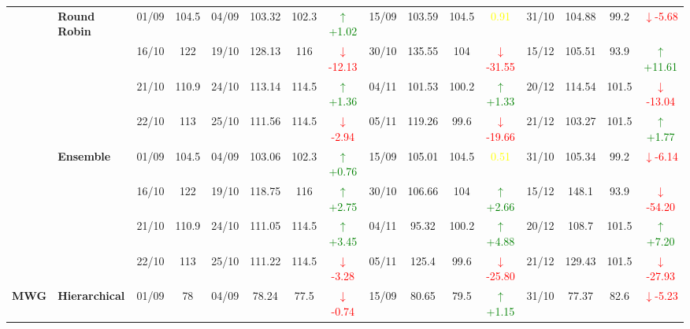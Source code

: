 \documentclass{ieeeaccess}
\begin{document}
{\begin{longtable}{llcc|cccc|cccc|cccc}
& \textbf{Round Robin}
& 01/09 & 104.5 & 04/09 & 103.32 & 102.3 & \textcolor{green}{\(\uparrow\)+1.02} & 15/09 & 103.59 & 104.5 & \textcolor{yellow}{0.91} & 31/10 & 104.88 & 99.2 & \textcolor{red}{\(\downarrow\)-5.68} \\

&
& 16/10 & 122 & 19/10 & 128.13 & 116 & \textcolor{red}{\(\downarrow\)-12.13} & 30/10 & 135.55 & 104 & \textcolor{red}{\(\downarrow\)-31.55} & 15/12 & 105.51 & 93.9 & \textcolor{green}{\(\uparrow\)+11.61} \\

&
& 21/10 & 110.9 & 24/10 & 113.14 & 114.5 & \textcolor{green}{\(\uparrow\)+1.36} & 04/11 & 101.53 & 100.2 & \textcolor{green}{\(\uparrow\)+1.33} & 20/12 & 114.54 & 101.5 & \textcolor{red}{\(\downarrow\)-13.04} \\

&
& 22/10 & 113 & 25/10 & 111.56 & 114.5 & \textcolor{red}{\(\downarrow\)-2.94} & 05/11 & 119.26 & 99.6 & \textcolor{red}{\(\downarrow\)-19.66} & 21/12 & 103.27 & 101.5 & \textcolor{green}{\(\uparrow\)+1.77} \\
\cmidrule(lr){2-16}


& \textbf{Ensemble}
& 01/09 & 104.5 & 04/09 & 103.06 & 102.3 & \textcolor{green}{\(\uparrow\)+0.76} & 15/09 & 105.01 & 104.5 & \textcolor{yellow}{0.51} & 31/10 & 105.34 & 99.2 & \textcolor{red}{\(\downarrow\)-6.14} \\

&
& 16/10 & 122 & 19/10 & 118.75 & 116 & \textcolor{green}{\(\uparrow\)+2.75} & 30/10 & 106.66 & 104 & \textcolor{green}{\(\uparrow\)+2.66} & 15/12 & 148.1 & 93.9 & \textcolor{red}{\(\downarrow\)-54.20} \\

&
& 21/10 & 110.9 & 24/10 & 111.05 & 114.5 & \textcolor{green}{\(\uparrow\)+3.45} & 04/11 & 95.32 & 100.2 & \textcolor{green}{\(\uparrow\)+4.88} & 20/12 & 108.7 & 101.5 & \textcolor{green}{\(\uparrow\)+7.20} \\

&
& 22/10 & 113 & 25/10 & 111.22 & 114.5 & \textcolor{red}{\(\downarrow\)-3.28} & 05/11 & 125.4 & 99.6 & \textcolor{red}{\(\downarrow\)-25.80} & 21/12 & 129.43 & 101.5 & \textcolor{red}{\(\downarrow\)-27.93} \\
\midrule




\multirow{12}{*}{\textbf{MWG}} 
& \textbf{Hierarchical}
& 01/09 & 78 & 04/09 & 78.24 & 77.5 & \textcolor{red}{\(\downarrow\)-0.74} & 15/09 & 80.65 & 79.5 & \textcolor{green}{\(\uparrow\)+1.15} & 31/10 & 77.37 & 82.6 & \textcolor{red}{\(\downarrow\)-5.23} \\


\end{longtable}}
\end{document}
